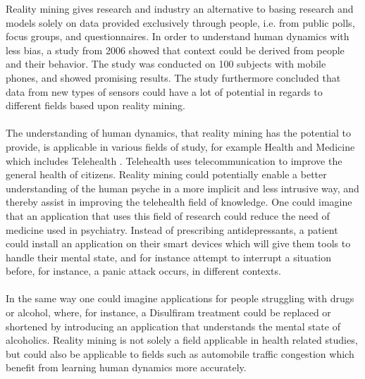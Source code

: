 
Reality mining gives research and industry an alternative to basing research and models solely on data provided exclusively through people, i.e. from public polls, focus groups, and questionnaires. In order to understand human dynamics with less bias, a study from 2006 \parencite{eagle2006_reality_mining_definition} showed that context could be derived from people and their behavior. The study was conducted on 100 subjects with mobile phones, and showed promising results. The study furthermore concluded that data from new types of sensors could have a lot of potential in regards to different fields based upon reality mining. 
\\\\
The understanding of human dynamics, that reality mining has the potential to provide, is applicable in various fields of study, for example Health and Medicine \parencite{pentland2009_reality_mining_health_medicine} which includes Telehealth \parencite{telehealth_aau}. Telehealth uses telecommunication to improve the general health of citizens. Reality mining could potentially enable a better understanding of the human psyche in a more implicit and less intrusive way, and thereby assist in improving the telehealth field of knowledge. One could imagine that an application that uses this field of research could reduce the need of medicine used in psychiatry. Instead of prescribing antidepressants, a patient could install an application on their smart devices which will give them tools to handle their mental state, and for instance attempt to interrupt a situation before, for instance, a panic attack occurs, in different contexts. 
\\\\
In the same way one could imagine applications for people struggling with drugs or alcohol, where, for instance, a Disulfiram \parencite{nlm_disulfiram} treatment could be replaced or shortened by introducing an application that understands the mental state of alcoholics. Reality mining is not solely a field applicable in health related studies, but could also be applicable to fields such as automobile traffic congestion \parencite{pentland2009reality_mining_mobile_communication_gps} which benefit from learning human dynamics more accurately.
\\\\
